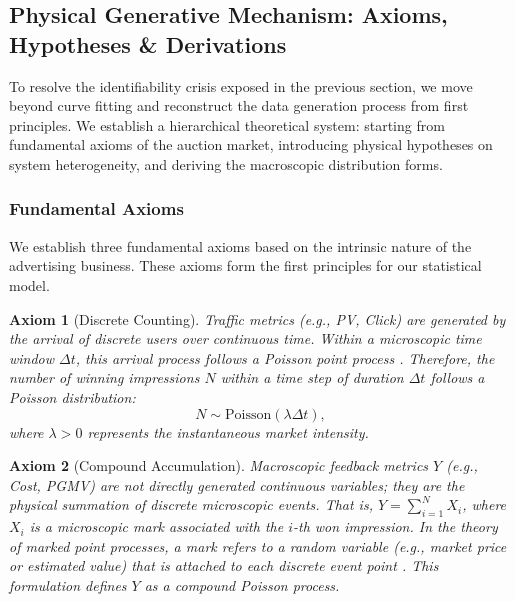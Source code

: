 \documentclass[sigconf, anonymous, review]{acmart}
\newtheorem{axiom}{Axiom}
\begin{document}
\subsection{Physical Generative Mechanism: Axioms, Hypotheses \& Derivations}
\label{ssec:physical_mechanism}
To resolve the identifiability crisis exposed in the previous section, we move beyond curve fitting and reconstruct the data generation process from first principles. We establish a hierarchical theoretical system: starting from fundamental axioms of the auction market, introducing physical hypotheses on system heterogeneity, and deriving the macroscopic distribution forms.

\subsubsection{Fundamental Axioms}
We establish three fundamental axioms based on the intrinsic nature of the advertising business.
These axioms form the first principles for our statistical model.

\begin{axiom}[Discrete Counting]
\label{ax:counting}
Traffic metrics (e.g., PV, Click) are generated by the arrival of discrete users over continuous time. Within a microscopic time window $\Delta t$, this arrival process follows a Poisson point process \cite{kingman1992poisson}. Therefore, the number of winning impressions $N$ within a time step of duration $\Delta t$ follows a Poisson distribution:
\begin{equation}
    N \sim \text{Poisson}(\lambda \Delta t),
\end{equation}
where $\lambda > 0$ represents the instantaneous market intensity.
\end{axiom}

\begin{axiom}[Compound Accumulation]
\label{ax:compound}
Macroscopic feedback metrics $Y$ (e.g., Cost, PGMV) are not directly generated continuous variables; they are the physical summation of discrete microscopic events. That is, $Y = \sum_{i=1}^N X_i$, where $X_i$ is a microscopic mark associated with the $i$-th won impression. In the theory of marked point processes, a mark refers to a random variable (e.g., market price or estimated value) that is attached to each discrete event point \cite{kingman1992poisson}. This formulation defines $Y$ as a compound Poisson process.
\end{axiom}
\end{document}
